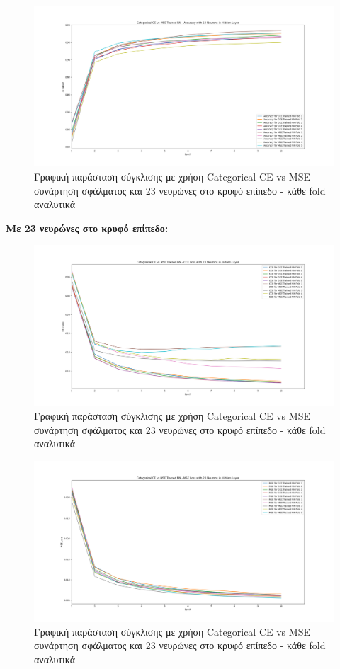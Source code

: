 \documentclass[12pt,a4paper]{article}
\begin{document}
\begin{figure}[H]
	\includegraphics[width=\textwidth]{6. CCE vs MSE - Accuracy - 12 Neurons.png}
	\caption{Γραφική παράσταση σύγκλισης με χρήση Categorical CE vs MSE συνάρτηση σφάλματος και 23 νευρώνες στο κρυφό επίπεδο - κάθε fold αναλυτικά}
\end{figure}

\textbf{Με 23 νευρώνες στο κρυφό επίπεδο:}

\begin{figure}[H]
	\includegraphics[width=\textwidth]{7. CCE vs MSE - CCE Loss - 23 Neurons.png}
	\caption{Γραφική παράσταση σύγκλισης με χρήση Categorical CE vs MSE συνάρτηση σφάλματος και 23 νευρώνες στο κρυφό επίπεδο - κάθε fold αναλυτικά}
\end{figure}

\begin{figure}[H]
	\includegraphics[width=\textwidth]{8. CCE vs MSE - MSE Loss - 23 Neurons.png}
	\caption{Γραφική παράσταση σύγκλισης με χρήση Categorical CE vs MSE συνάρτηση σφάλματος και 23 νευρώνες στο κρυφό επίπεδο - κάθε fold αναλυτικά}
\end{figure}
\end{document}
